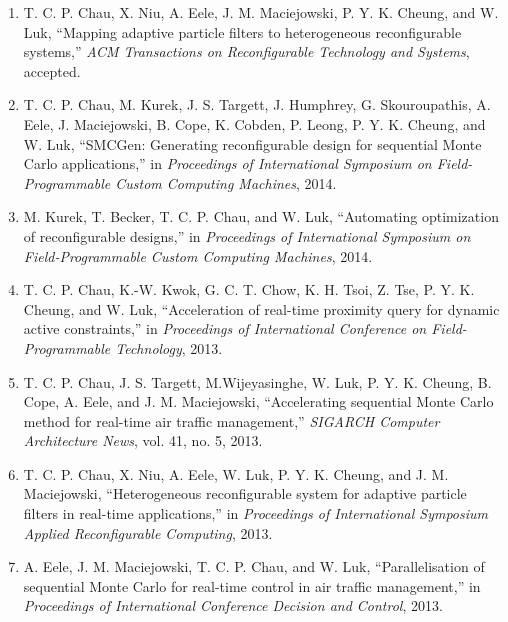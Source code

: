 
\cleardoublepage

{}

\begin{publications}

%
\begin{enumerate}[I]
\item T. C. P. Chau, X. Niu, A. Eele, J. M. Maciejowski, P. Y. K. Cheung, and W. Luk, ``Mapping adaptive particle ﬁlters to heterogeneous reconﬁgurable systems,'' \textit{ACM Transactions on Reconﬁgurable Technology and Systems}, accepted.
\item T. C. P. Chau, M. Kurek, J. S. Targett, J. Humphrey, G. Skouroupathis, A. Eele, J. Maciejowski, B. Cope, K. Cobden, P. Leong, P. Y. K. Cheung, and W. Luk, ``SMCGen: Generating reconfigurable design for sequential Monte Carlo applications,'' in \textit{Proceedings of International Symposium on Field-Programmable Custom Computing Machines}, 2014.%
\item M. Kurek, T. Becker, T. C. P. Chau, and W. Luk, ``Automating optimization of reconfigurable designs,'' in \textit{Proceedings of International Symposium on Field-Programmable Custom Computing Machines}, 2014.%
\item T. C. P. Chau, K.-W. Kwok, G. C. T. Chow, K. H. Tsoi, Z. Tse, P. Y. K. Cheung, and W. Luk, ``Acceleration of real-time proximity query for dynamic active constraints,'' in \textit{Proceedings of International Conference on Field-Programmable Technology}, 2013.%
\item T. C. P. Chau, J. S. Targett, M.Wijeyasinghe, W. Luk, P. Y. K. Cheung, B. Cope, A. Eele, and J. M. Maciejowski, ``Accelerating sequential Monte Carlo method for real-time air traffic management,'' \textit{SIGARCH Computer Architecture News}, vol. 41, no. 5, 2013.
\item T. C. P. Chau, X. Niu, A. Eele, W. Luk, P. Y. K. Cheung, and J. M. Maciejowski, ``Heterogeneous reconfigurable system for adaptive particle filters in real-time applications,'' in \textit{Proceedings of International Symposium Applied Reconfigurable Computing}, 2013.%
\item A. Eele, J. M. Maciejowski, T. C. P. Chau, and W. Luk, ``Parallelisation of sequential Monte Carlo for real-time control in air traffic management,'' in \textit{Proceedings of International Conference Decision and Control}, 2013.

\end{enumerate}
\end{publications}
